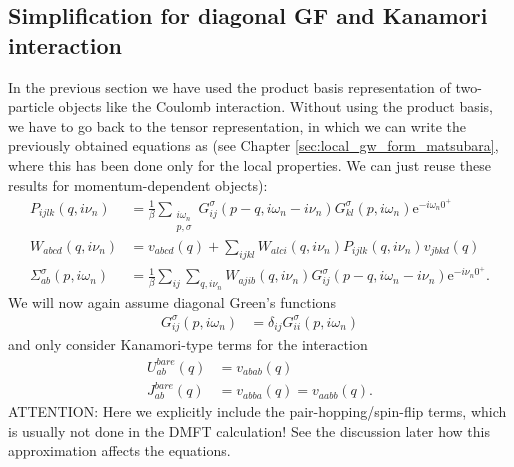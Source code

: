 \documentclass[12pt,a4paper]{scrartcl}
\numberwithin{equation}{section}
\newcommand{\cng}[1]{{\color{red}#1}}
\begin{document}
\subsection{Simplification for diagonal GF and Kanamori interaction}
In the previous section we have used the product basis representation
of two-particle objects like the Coulomb interaction.
Without using the product basis, we have to go back
to the tensor representation, in which we can write the previously
obtained equations as (see Chapter \ref{sec:local_gw_form_matsubara}, where this
has been done only for the local properties. We can just reuse these results
for momentum-dependent objects):
\begin{align}
 P_{ijlk}(q,i\nu_n)
&=  \frac{1}{\beta}\sum_{\substack{i\omega_n\\ p, \sigma}} 
     G^{\sigma}_{ij}(p-q,i\omega_n-i\nu_n) G^{\sigma}_{kl}(p,i\omega_n) \mathrm{e}^{-i\omega_n 0^+}   \\
%
W_{abcd}(q,i\nu_n)
&= v_{abcd}(q) + \sum_{ijkl} W_{alci}(q,i\nu_n) P_{ijlk}(q,i\nu_n) v_{jbkd}(q) \\
%
\Sigma^{\sigma}_{ab}(p,i\omega_n)
%
&= \frac{1}{\beta}\sum_{ij}\sum_{q,i\nu_n}  W_{ajib}(q,i\nu_n)  
                  G^{\sigma}_{ij}(p-q,i\omega_n-i\nu_n) \mathrm{e}^{-i\nu_n0^+} .
\end{align}
We will now again assume diagonal Green's functions 
\begin{align}
 G^{\sigma}_{ij}(p,i\omega_n)
 &= \delta_{ij}G^{\sigma}_{ii}(p,i\omega_n) 
\end{align}
and only consider Kanamori-type terms for the interaction
\begin{align}
 U^{bare}_{ab}(q) &= v_{abab}(q) \\
 J^{bare}_{ab}(q) &= v_{abba}(q)=v_{aabb}(q).
\end{align}
\cng{ATTENTION:} Here we explicitly include the pair-hopping/spin-flip
terms, which is usually not done in the DMFT calculation! See the discussion later
how this approximation affects the equations.

\bigskip
\end{document}
